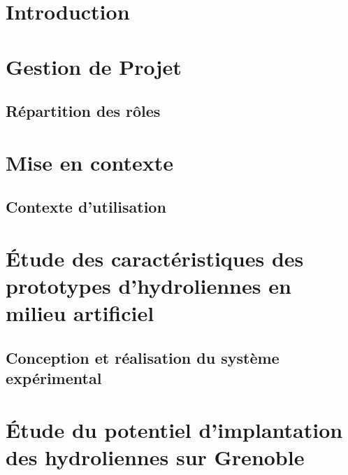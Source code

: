 \documentclass[11pt]{report}
\begin{document}




	\listoffigures

    \listoftables

\chapter{Introduction}
    

\chapter{Gestion de Projet}


    \section{Répartition des rôles}


\chapter{Mise en contexte}

    \section{Contexte d'utilisation}


\chapter[Étude d'hydroliennes en milieu artificiel]{Étude des caractéristiques des prototypes d'hydroliennes en milieu artificiel}

    \section{Conception et réalisation du système expérimental}

\chapter[Implantation des hydroliennes sur Grenoble]{Étude du potentiel d'implantation des hydroliennes sur Grenoble}
\end{document}
